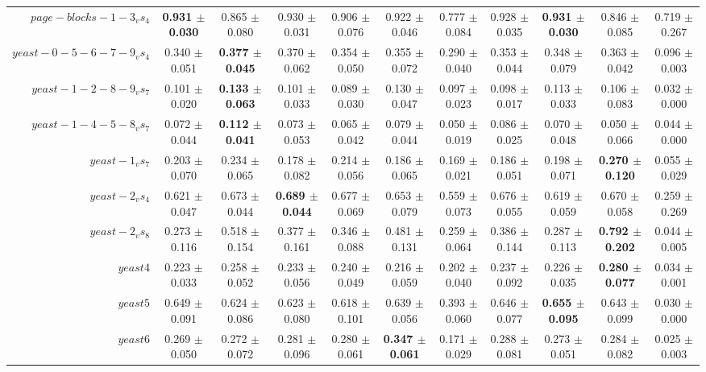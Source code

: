 \begin{table}[!ht]
{\begin{tabular}{r c c c c c c c c c c}
$page-blocks-1-3_vs_4$ & \textbf{0.931 $\pm$ 0.030} & 0.865 $\pm$ 0.080 & 0.930 $\pm$ 0.031 & 0.906 $\pm$ 0.076 & 0.922 $\pm$ 0.046 & 0.777 $\pm$ 0.084 & 0.928 $\pm$ 0.035 & \textbf{0.931 $\pm$ 0.030} & 0.846 $\pm$ 0.085 & 0.719 $\pm$ 0.267 \\
$yeast-0-5-6-7-9_vs_4$ & 0.340 $\pm$ 0.051 & \textbf{0.377 $\pm$ 0.045} & 0.370 $\pm$ 0.062 & 0.354 $\pm$ 0.050 & 0.355 $\pm$ 0.072 & 0.290 $\pm$ 0.040 & 0.353 $\pm$ 0.044 & 0.348 $\pm$ 0.079 & 0.363 $\pm$ 0.042 & 0.096 $\pm$ 0.003 \\
$yeast-1-2-8-9_vs_7$ & 0.101 $\pm$ 0.020 & \textbf{0.133 $\pm$ 0.063} & 0.101 $\pm$ 0.033 & 0.089 $\pm$ 0.030 & 0.130 $\pm$ 0.047 & 0.097 $\pm$ 0.023 & 0.098 $\pm$ 0.017 & 0.113 $\pm$ 0.033 & 0.106 $\pm$ 0.083 & 0.032 $\pm$ 0.000 \\
$yeast-1-4-5-8_vs_7$ & 0.072 $\pm$ 0.044 & \textbf{0.112 $\pm$ 0.041} & 0.073 $\pm$ 0.053 & 0.065 $\pm$ 0.042 & 0.079 $\pm$ 0.044 & 0.050 $\pm$ 0.019 & 0.086 $\pm$ 0.025 & 0.070 $\pm$ 0.048 & 0.050 $\pm$ 0.066 & 0.044 $\pm$ 0.000 \\
$yeast-1_vs_7$ & 0.203 $\pm$ 0.070 & 0.234 $\pm$ 0.065 & 0.178 $\pm$ 0.082 & 0.214 $\pm$ 0.056 & 0.186 $\pm$ 0.065 & 0.169 $\pm$ 0.021 & 0.186 $\pm$ 0.051 & 0.198 $\pm$ 0.071 & \textbf{0.270 $\pm$ 0.120} & 0.055 $\pm$ 0.029 \\
$yeast-2_vs_4$ & 0.621 $\pm$ 0.047 & 0.673 $\pm$ 0.044 & \textbf{0.689 $\pm$ 0.044} & 0.677 $\pm$ 0.069 & 0.653 $\pm$ 0.079 & 0.559 $\pm$ 0.073 & 0.676 $\pm$ 0.055 & 0.619 $\pm$ 0.059 & 0.670 $\pm$ 0.058 & 0.259 $\pm$ 0.269 \\
$yeast-2_vs_8$ & 0.273 $\pm$ 0.116 & 0.518 $\pm$ 0.154 & 0.377 $\pm$ 0.161 & 0.346 $\pm$ 0.088 & 0.481 $\pm$ 0.131 & 0.259 $\pm$ 0.064 & 0.386 $\pm$ 0.144 & 0.287 $\pm$ 0.113 & \textbf{0.792 $\pm$ 0.202} & 0.044 $\pm$ 0.005 \\
$yeast4$ & 0.223 $\pm$ 0.033 & 0.258 $\pm$ 0.052 & 0.233 $\pm$ 0.056 & 0.240 $\pm$ 0.049 & 0.216 $\pm$ 0.059 & 0.202 $\pm$ 0.040 & 0.237 $\pm$ 0.092 & 0.226 $\pm$ 0.035 & \textbf{0.280 $\pm$ 0.077} & 0.034 $\pm$ 0.001 \\
$yeast5$ & 0.649 $\pm$ 0.091 & 0.624 $\pm$ 0.086 & 0.623 $\pm$ 0.080 & 0.618 $\pm$ 0.101 & 0.639 $\pm$ 0.056 & 0.393 $\pm$ 0.060 & 0.646 $\pm$ 0.077 & \textbf{0.655 $\pm$ 0.095} & 0.643 $\pm$ 0.099 & 0.030 $\pm$ 0.000 \\
$yeast6$ & 0.269 $\pm$ 0.050 & 0.272 $\pm$ 0.072 & 0.281 $\pm$ 0.096 & 0.280 $\pm$ 0.061 & \textbf{0.347 $\pm$ 0.061} & 0.171 $\pm$ 0.029 & 0.288 $\pm$ 0.081 & 0.273 $\pm$ 0.051 & 0.284 $\pm$ 0.082 & 0.025 $\pm$ 0.003 \\

\end{tabular}}
\end{table}
